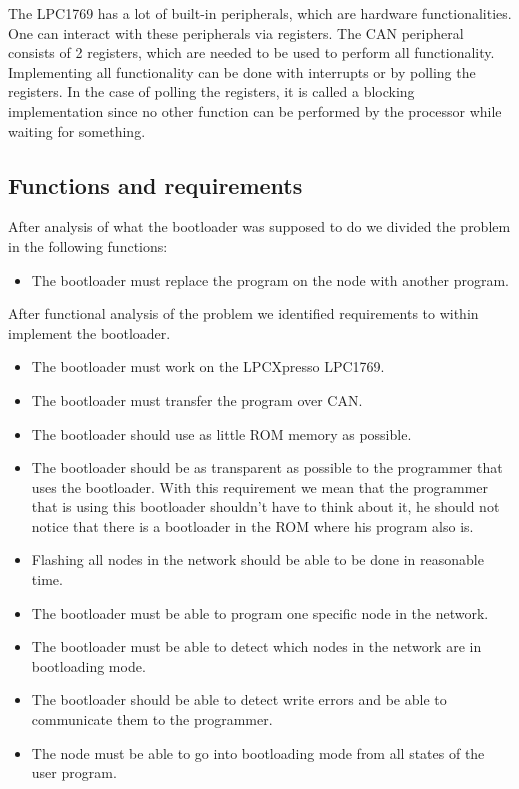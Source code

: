 \documentclass[twocolumn]{article}
\begin{document}
		The LPC1769 has a lot of built-in peripherals,
		which are hardware functionalities.
		One can interact with these peripherals via registers.
		The CAN peripheral consists of 2 registers, which are needed to be used to perform all functionality.
		Implementing all functionality can be done with interrupts or by polling the registers.
		In the case of polling the registers, it is called a blocking implementation since no other function can be performed by the processor while waiting for something.
	
	\subsection*{Functions and requirements}
		After analysis of what the bootloader was supposed to do we divided the problem in the following functions:
		\begin{itemize}
			\item The bootloader must replace the program on the node with another program.
		\end{itemize}
		After functional analysis of the problem we identified requirements to within implement the bootloader.
		\begin{itemize}
			\item The bootloader must work on the LPCXpresso LPC1769.
			\item The bootloader must transfer the program over CAN.
			\item The bootloader should use as little ROM memory as possible.
			\item The bootloader should be as transparent as possible to the programmer that uses the bootloader.
				With this requirement we mean that the programmer that is using this bootloader shouldn't have to think about it,
				he should not notice that there is a bootloader in the ROM where his program also is.
			\item Flashing all nodes in the network should be able to be done in reasonable time.
			\item The bootloader must be able to program one specific node in the network.
			\item The bootloader must be able to detect which nodes in the network are in bootloading mode.
			\item The bootloader should be able to detect write errors and be able to communicate them to the programmer.
			\item The node must be able to go into bootloading mode from all states of the user program.
		\end{itemize}
		
\end{document}
